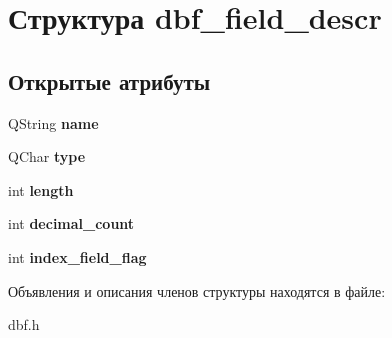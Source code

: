 \hypertarget{structdbf__field__descr}{\section{Структура dbf\-\_\-field\-\_\-descr}
\label{structdbf__field__descr}
}
\subsection*{Открытые атрибуты}
\begin{DoxyCompactItemize}
\item 
\hypertarget{structdbf__field__descr_a2ae1a01fd0931b6030dff960e21fc51a}{\-Q\-String {\bfseries name}}\label{structdbf__field__descr_a2ae1a01fd0931b6030dff960e21fc51a}

\item 
\hypertarget{structdbf__field__descr_a7af59e7028fd1784ca249fabb411f59f}{\-Q\-Char {\bfseries type}}\label{structdbf__field__descr_a7af59e7028fd1784ca249fabb411f59f}

\item 
\hypertarget{structdbf__field__descr_ab0247121152e565fdf6c414fea5ed51f}{int {\bfseries length}}\label{structdbf__field__descr_ab0247121152e565fdf6c414fea5ed51f}

\item 
\hypertarget{structdbf__field__descr_ac8a5707d2430c62ccc913e7cffe929c7}{int {\bfseries decimal\-\_\-count}}\label{structdbf__field__descr_ac8a5707d2430c62ccc913e7cffe929c7}

\item 
\hypertarget{structdbf__field__descr_af88ddc41373dad3026466cfcdde34196}{int {\bfseries index\-\_\-field\-\_\-flag}}\label{structdbf__field__descr_af88ddc41373dad3026466cfcdde34196}

\end{DoxyCompactItemize}


Объявления и описания членов структуры находятся в файле\-:\begin{DoxyCompactItemize}
\item 
dbf.\-h\end{DoxyCompactItemize}
